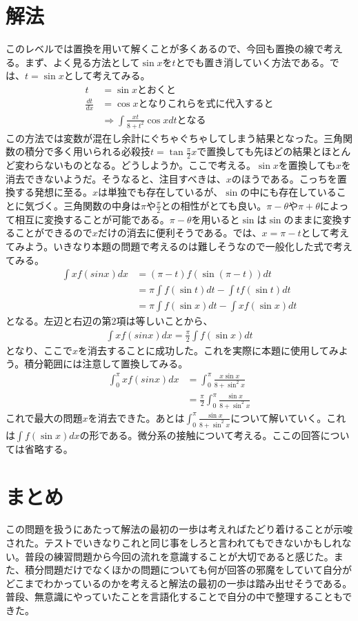 \documentclass[12pt]{jarticle}
\begin{document}
\section{解法}
このレベルでは置換を用いて解くことが多くあるので、今回も置換の線で考える。まず、よく見る方法として$\sin{x}$を$t$とでも置き消していく方法である。では、$ \displaystyle t = \sin{x}$として考えてみる。
\begin{align*}
  \label{07}
  \displaystyle t &= \sin{x}とおくと\\
  \frac{dt}{dx} &= \cos{x}となりこれらを式に代入すると\\
  &\Rightarrow\int \frac{xt}{8 + t^{2}}\cos{x} dtとなる
\end{align*}
この方法では変数が混在し余計にぐちゃぐちゃしてしまう結果となった。三角関数の積分で多く用いられる必殺技$\displaystyle t = \tan{\frac{\pi}{2}}x$で置換しても先ほどの結果とほとんど変わらないものとなる。どうしようか。ここで考える。$\displaystyle \sin{x}$を置換しても$\displaystyle x$を消去できないようだ。そうなると、注目すべきは、$\displaystyle x$のほうである。こっちを置換する発想に至る。$\displaystyle x$は単独でも存在しているが、$\displaystyle \sin$の中にも存在していることに気づく。三角関数の中身は$\displaystyle \pi$や$\displaystyle \frac{\pi}{2}$との相性がとても良い。$\pi - \theta$や$\pi + \theta$によって相互に変換することが可能である。$\pi - \theta$を用いると$\displaystyle \sin$は$\displaystyle \sin$のままに変換することができるので$\displaystyle x$だけの消去に便利そうである。では、$\displaystyle x = \pi - t$として考えてみよう。いきなり本題の問題で考えるのは難しそうなので一般化した式で考えてみる。
\begin{align*}
  \displaystyle \int xf(sin{x})dx &= (\pi - t)f(\sin(\pi - t)) dt \\
  &= \pi \int f(\sin{t}) dt - \int tf(\sin{t}) dt \\
  &= \pi \int f(\sin{x}) dt - \int xf(\sin{x}) dt
\end{align*}
となる。左辺と右辺の第$2$項は等しいことから、
\begin{align*}
  \displaystyle \int xf(sin{x})dx =\frac{\pi}{2} \int f(\sin{x}) dt \tag*{(7)}
\end{align*}
となり、ここで$\displaystyle x$を消去することに成功した。これを実際に本題に使用してみよう。積分範囲には注意して置換してみる。
\begin{align*}
  \displaystyle \int_0^{\pi} xf(sin{x})dx &= \int_0^{\pi} \frac{x\sin{x}}{8 + \sin^{2}{x}} \\
  &=\frac{\pi}{2}\int_0^{\pi} \frac{\sin{x}}{8 + \sin^{2}{x}}
\end{align*}
これで最大の問題$\displaystyle x$を消去できた。あとは$\displaystyle \int_0^{\pi} \frac{\sin{x}}{8 + \sin^{2}{x}}$について解いていく。これは$\displaystyle \int f(\sin{x}) dx$の形である。微分系の接触について考える。ここの回答については省略する。
\section{まとめ}
この問題を扱うにあたって解法の最初の一歩は考えればたどり着けることが示唆された。テストでいきなりこれと同じ事をしろと言われてもできないかもしれない。普段の練習問題から今回の流れを意識することが大切であると感じた。また、積分問題だけでなくほかの問題についても何が回答の邪魔をしていて自分がどこまでわかっているのかを考えると解法の最初の一歩は踏み出せそうである。普段、無意識にやっていたことを言語化することで自分の中で整理することもできた。
\end{document}
